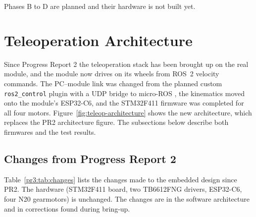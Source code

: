\documentclass[12pt,a4paper]{article}
\begin{document}
Phases B to D are planned and their hardware is not built yet.

\clearpage
\section{Teleoperation Architecture}
\label{sec:teleop-architecture}

Since Progress Report 2 the teleoperation stack has been brought up on the real module, and
the module now drives on its wheels from ROS~2 velocity commands. The PC--module link was
changed from the planned custom \texttt{ros2\_control} plugin with a UDP bridge to
micro-ROS \cite{microros}, the kinematics moved onto the module's ESP32-C6, and the STM32F411
firmware was completed for all four motors. Figure~\ref{fig:teleop-architecture} shows the
new architecture, which replaces the PR2 architecture figure. The subsections below describe
both firmwares and the test results.

\subsection{Changes from Progress Report 2}

Table~\ref{pr3:tab:changes} lists the changes made to the embedded design since PR2.
The hardware (STM32F411 board, two TB6612FNG drivers, ESP32-C6, four N20 gearmotors)
is unchanged. The changes are in the software architecture and in corrections found
during bring-up.
\end{document}
